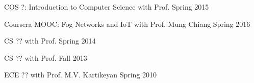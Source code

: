 

\begin{cvhonors}

  \cvhonor
    {COS ?: Introduction to Computer Science} %
    {with Prof.} %
    {Spring 2015} %
    {} %
    
  \cvhonor
    {Coursera MOOC: Fog Networks and IoT} %
    {with Prof. Mung Chiang} %
    {Spring 2016} %
    {} %
    
\end{cvhonors}
    

\begin{cvhonors}
  \cvhonor
    {CS ??} %
    {with Prof.} %
    {Spring 2014} %
    {} %


  \cvhonor
    {CS ??} %
    {with Prof.} %
    {Fall 2013} %
    {} %

\end{cvhonors}

\begin{cvhonors}
  \cvhonor
    {ECE ??} %
    {with Prof. M.V. Kartikeyan} %
    {Spring 2010} %
    {} %

\end{cvhonors}
